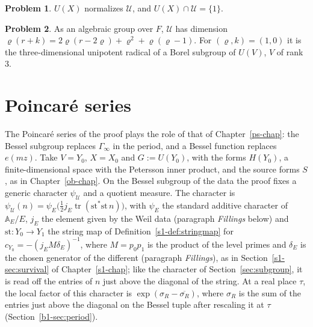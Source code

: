 \documentclass[reqno]{amsart}
\newcounter{chap}
\theoremstyle{definition}
\newtheorem{problem}{Problem}[section]
\theoremstyle{plain}
\theoremstyle{remark}
\newcommand{\A}{\mathbb A}
\newcommand{\Uc}{{\mathcal{U}}}
\begin{document}
\begin{problem}\label{pr:normalize}
\(U(X)\) normalizes \(\Uc\), and \(U(X)\cap \Uc=\{1\}\).
\end{problem}

\begin{problem}\label{pr:dimN}
As an algebraic group over \(F\), \(\Uc\) has dimension \(\varrho(r+k)=2\varrho(r-2\varrho)+\varrho^2+\varrho(\varrho-1)\).  For \((\varrho,k)=(1,0)\) it is the three-dimensional unipotent radical of a Borel subgroup of \(U(V)\), \(V\) of rank \(3\).
\end{problem}

\section{Poincar\'e series}\label{sec:poincare}

The Poincar\'e series of the proof plays the role of that of Chapter~\ref{ps-chap}: the Bessel subgroup replaces \(\Gamma_\infty\) in the period, and a Bessel function replaces \(e(mz)\).  Take \(V=Y_0\), \(X=X_0\) and \(G:=U(Y_0)\), with the forms \(H(Y_0)\), a finite-dimensional space with the Petersson inner product, and the source forms \(S\), as in Chapter~\ref{ob-chap}.  On the Bessel subgroup of the data the proof fixes a generic character \(\psi_{\Uc}\) and a quotient measure.  The character is \(\psi_{\Uc}(n)=\psi_E\bigl(\tfrac12j_E\operatorname{tr}(\mathrm{st}^*\mathrm{st}\,n)\bigr)\), with \(\psi_E\) the standard additive character of \(\A_E/E\), \(j_E\) the element given by the Weil data (paragraph \emph{Fillings} below) and \(\mathrm{st}\colon Y_0\to Y_1\) the string map of Definition~\ref{s1-def:stringmap} for \(c_{Y_0}=-(j_EM\delta_E)^{-1}\), where \(M=p_0p_1\) is the product of the level primes and \(\delta_E\) is the chosen generator of the different (paragraph \emph{Fillings}), as in Section~\ref{s1-sec:survival} of Chapter~\ref{s1-chap}; like the character of Section~\ref{sec:subgroup}, it is read off the entries of \(n\) just above the diagonal of the string.  At a real place \(\tau\), the local factor of this character is \(\exp(\sigma_R-\overline{\sigma_R})\), where \(\sigma_R\) is the sum of the entries just above the diagonal on the Bessel tuple after rescaling it at \(\tau\) (Section~\ref{b1-sec:period}).
\end{document}
